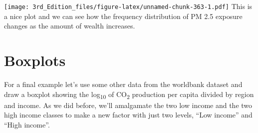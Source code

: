 \documentclass[
]{book}
\newenvironment{Shaded}{\begin{snugshade}}{\end{snugshade}}
\newcommand{\DataTypeTok}[1]{\textcolor[rgb]{0.13,0.29,0.53}{#1}}
\newcommand{\DecValTok}[1]{\textcolor[rgb]{0.00,0.00,0.81}{#1}}
\newcommand{\KeywordTok}[1]{\textcolor[rgb]{0.13,0.29,0.53}{\textbf{#1}}}
\newcommand{\NormalTok}[1]{#1}
\newcommand{\OperatorTok}[1]{\textcolor[rgb]{0.81,0.36,0.00}{\textbf{#1}}}
\newcommand{\StringTok}[1]{\textcolor[rgb]{0.31,0.60,0.02}{#1}}
\begin{document}
\begin{Shaded}
\end{Shaded}

\texttt{[image: 3rd\_Edition\_files/figure-latex/unnamed-chunk-363-1.pdf]}
This is a nice plot and we can see how the frequency distribution of PM 2.5 exposure changes as the amount of wealth increases.

\hypertarget{boxplots-1}{%
\section{Boxplots}\label{boxplots-1}}

For a final example let's use some other data from the worldbank dataset and draw a boxplot showing the log\textsubscript{10} of CO\textsubscript{2} production per capita divided by region and income. As we did before, we'll amalgamate the two low income and the two high income classes to make a new factor with just two levels, ``Low income'' and ``High income''.
\end{document}
